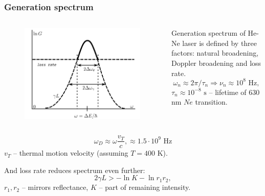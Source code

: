 \documentclass{beamer}
\begin{document}
	\begin{frame}
		\frametitle{Generation spectrum}
		
		\begin{columns}
			\begin{figure}
				\centering
				\includegraphics[width=1\linewidth]{res/generation_spectrum.png}
			\end{figure}
			Generation spectrum of He-Ne laser is defined by three factors: natural broadening, Doppler broadening and loss rate.
			$$ \omega_n \approx 2 \pi / \tau_n \Rightarrow \nu_n \approx10^{8} \text{ Hz} , $$
			$\tau_n \approx 10^{-8} \text{ s}$ -- lifetime of $630$ nm  $Ne$ transition.
		\end{columns}
				
		$$ \omega_D \approx \omega \frac{v_T}{c}, \approx 1.5 \cdot 10^9 \text{ Hz}$$
		$v_T$ -- thermal motion velocity (assuming $T = 400$ K).
		
		And loss rate reduces spectrum even further:
		$$ 2 \gamma L > - \ln{K} - \ln{r_1 r_2}, $$
		$r_1, r_2$ -- mirrors reflectance, $K$ -- part of remaining intensity.
	\end{frame}
	
\end{document}
